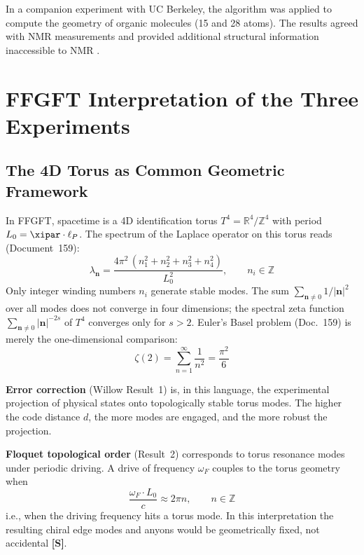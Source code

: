 In a companion experiment with UC Berkeley, the algorithm was applied to compute the
geometry of organic molecules (15 and 28 atoms). The results agreed with NMR
measurements and provided additional structural information inaccessible to NMR
\cite{GoogleEchoes2025}.


\section{FFGFT Interpretation of the Three Experiments}

\subsection{The 4D Torus as Common Geometric Framework}

In FFGFT, spacetime is a 4D identification torus
$T^4 = \mathbb{R}^4/\mathbb{Z}^4$ with period $L_0 = \xipar \cdot \ell_P$.
The spectrum of the Laplace operator on this torus reads (Document~159):
\begin{equation}
    \lambda_{\mathbf{n}} = \frac{4\pi^2\,(n_1^2 + n_2^2 + n_3^2 + n_4^2)}{L_0^2},
    \qquad n_i \in \mathbb{Z}
\end{equation}
Only integer winding numbers $n_i$ generate stable modes. The sum
$\sum_{\mathbf{n}\neq 0} 1/|\mathbf{n}|^2$ over all modes does not converge in four
dimensions; the spectral zeta function $\sum_{\mathbf{n}\neq0}|\mathbf{n}|^{-2s}$
of $T^4$ converges only for $s > 2$. Euler's Basel problem (Doc.~159) is merely
the one-dimensional comparison:
\begin{equation}
    \zeta(2) = \sum_{n=1}^{\infty} \frac{1}{n^2} = \frac{\pi^2}{6}
\end{equation}

\textbf{Error correction} (Willow Result~1) is, in this language, the
experimental projection of physical states onto topologically stable torus modes.
The higher the code distance $d$, the more modes are engaged, and the more robust
the projection.

\textbf{Floquet topological order} (Result~2) corresponds to torus resonance
modes under periodic driving. A drive of frequency $\omega_F$ couples to the torus
geometry when
\begin{equation}
    \frac{\omega_F \cdot L_0}{c} \approx 2\pi n, \qquad n \in \mathbb{Z}
\end{equation}
i.e., when the driving frequency hits a torus mode. In this interpretation the resulting chiral edge modes
and anyons would be geometrically fixed, not accidental \textbf{[S]}.

